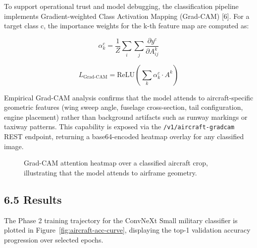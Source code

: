\documentclass[11pt,a4paper]{article}
\begin{document}
To support operational trust and model debugging, the classification pipeline implements Gradient-weighted Class Activation Mapping (Grad-CAM) [6]. For a target class c, the importance weights for the k-th feature map are computed as:

\[\alpha_k^c = \frac{1}{Z} \sum_i \sum_j \frac{\partial y^c}{\partial A_{ij}^k} \tag{6}\]

\[L_{\text{Grad-CAM}} = \text{ReLU}\left(\sum_k \alpha_k^c \cdot A^k\right) \tag{7}\]

Empirical Grad-CAM analysis confirms that the model attends to aircraft-specific geometric features (wing sweep angle, fuselage cross-section, tail configuration, engine placement) rather than background artifacts such as runway markings or taxiway patterns. This capability is exposed via the \texttt{/v1/aircraft-gradcam} REST endpoint, returning a base64-encoded heatmap overlay for any classified image.

\begin{figure}[htbp]
\centering
{}
\caption{Grad-CAM attention heatmap over a classified aircraft crop, illustrating that the model attends to airframe geometry.}
\label{fig:gradcam-example}
\end{figure}

\hypertarget{results-1}{%
\subsection{6.5 Results}\label{results-1}}

The Phase 2 training trajectory for the ConvNeXt Small military classifier is plotted in Figure~\ref{fig:aircraft-acc-curve}, displaying the top-1 validation accuracy progression over selected epochs.
\end{document}

